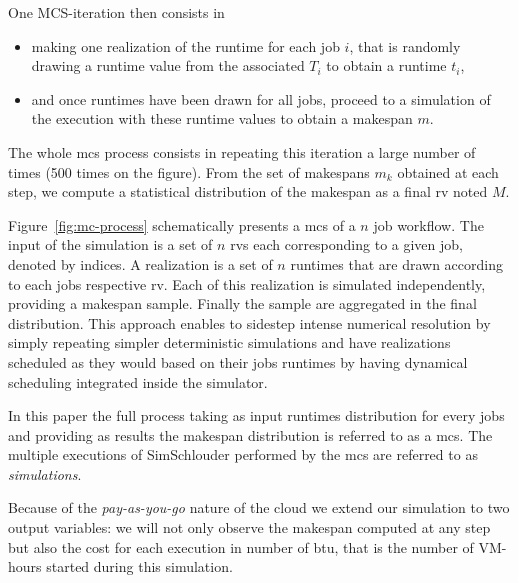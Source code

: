 \documentclass[10pt,conference,compsocconf]{IEEEtran}
\begin{document}
One MCS-iteration then consists in 
\begin{itemize}
\item making one realization of the runtime  for each job $i$, that is randomly
  drawing a runtime value from the associated $T_i$ to obtain a runtime $t_i$,
\item and once runtimes have been drawn for all jobs, proceed to a simulation
  of the execution with these runtime values to obtain a makespan $m$.
\end{itemize}
The whole \ac{mcs} process  consists in repeating this iteration a  large number
of times (500 times  on the  figure). From the  set of makespans  $m_k$ obtained
at each step, we compute  a statistical distribution of the makespan  as a final
\ac{rv} noted $M$.

Figure~\ref{fig:mc-process}  schematically  presents a  \ac{mcs}  of  a $n$  job
workflow.   The  input  of  the  simulation  is  a  set  of  $n$  \acp{rv}  each
corresponding to a given job, denoted by  indices. A realization is a set of $n$
runtimes that are drawn according to each jobs respective \ac{rv}.  Each of this
realization is  simulated independently,  providing a makespan  sample.  Finally
the sample are  aggregated in the final distribution.  This  approach enables to
sidestep intense numerical resolution  by simply repeating simpler deterministic
simulations and  have realizations scheduled as  they would based on  their jobs
runtimes by having dynamical scheduling integrated inside the simulator.


In this paper the full process taking as input runtimes distribution for
every jobs and providing as results the makespan distribution is referred to as a
\acf{mcs}. The multiple executions of SimSchlouder performed by the \ac{mcs} are
referred to as \emph{simulations}.

Because of the \emph{pay-as-you-go} nature of the cloud we extend our simulation
to two output variables: we will not only observe the makespan computed at any
step but also the cost for each execution in number of \ac{btu}, that is the
number of VM-hours started during this simulation.
\end{document}
